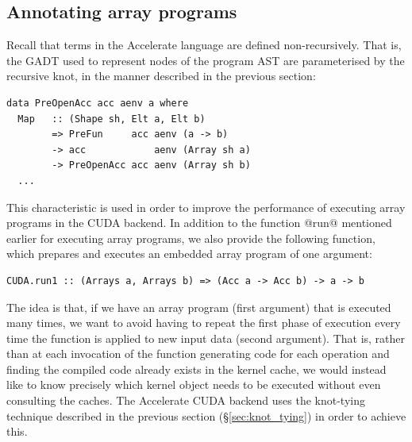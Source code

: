 \subsection{Annotating array programs}
\label{sec:annotating_array_programs}

Recall that terms in the Accelerate language are defined non-recursively. That
is, the GADT used to represent nodes of the program AST are parameterised by the
recursive knot, in the manner described in the previous section:
%
\begin{lstlisting}[style=haskell]
data PreOpenAcc acc aenv a where
  Map   :: (Shape sh, Elt a, Elt b)
        => PreFun     acc aenv (a -> b)
        -> acc            aenv (Array sh a)
        -> PreOpenAcc acc aenv (Array sh b)
  ...
\end{lstlisting}

This characteristic is used in order to improve the performance of executing
array programs in the CUDA backend. In addition to the function @run@
mentioned earlier for executing array programs, we also provide the following
function, which prepares and executes an embedded array program of one argument:
%
\begin{lstlisting}[style=haskell]
CUDA.run1 :: (Arrays a, Arrays b) => (Acc a -> Acc b) -> a -> b
\end{lstlisting}
%
The idea is that, if we have an array program (first argument) that is executed
many times, we want to avoid having to repeat the first phase of execution every
time the function is applied to new input data (second argument). That is,
rather than at each invocation of the function generating code for each
operation and finding the compiled code already exists in the kernel cache, we
would instead like to know precisely which kernel object needs to be executed
without even consulting the caches. The Accelerate CUDA backend uses the
knot-tying technique described in the previous section (\S\ref{sec:knot_tying})
in order to achieve this.

